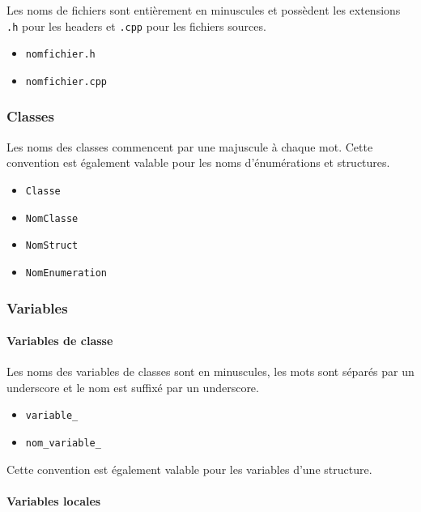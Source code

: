 \documentclass[]{report}
\begin{document}
Les noms de fichiers sont entièrement en minuscules
et possèdent les extensions \texttt{.h}
pour les headers et \texttt{.cpp} pour les fichiers sources.

\begin{itemize}
	\item \texttt{nomfichier.h}
	\item \texttt{nomfichier.cpp}
\end{itemize}

\subsubsection{Classes}

Les noms des classes commencent par une majuscule à chaque mot.
Cette convention est également valable pour les noms 
d'énumérations et structures.

\begin{itemize}
	\item \texttt{Classe}
	\item \texttt{NomClasse}
	\item \texttt{NomStruct}
	\item \texttt{NomEnumeration}
\end{itemize}

\newpage

\subsubsection{Variables}

\paragraph{Variables de classe}

Les noms des variables de classes sont en minuscules, les mots sont 
séparés par un underscore et le nom est suffixé par un underscore.

\begin{itemize}
	\item \texttt{variable\_}
	\item \texttt{nom\_variable\_}
\end{itemize}

Cette convention est également valable pour les variables d'une
structure.

\paragraph{Variables locales}
\end{document}
